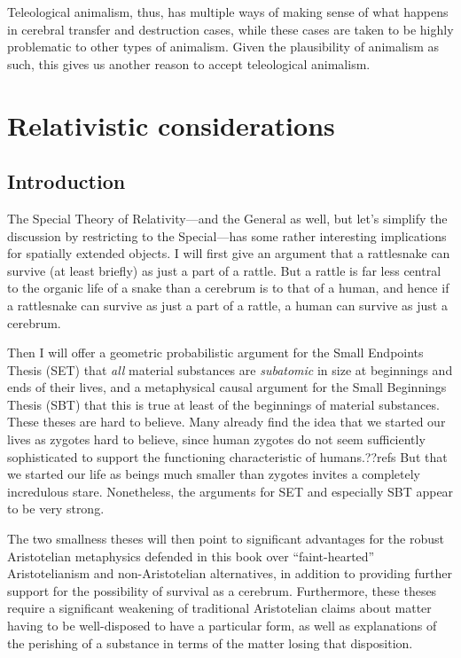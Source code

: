 Teleological animalism, thus, has multiple ways of making sense of what happens in cerebral transfer and destruction cases, while these cases
are taken to be highly problematic to other types of animalism. Given the plausibility of animalism as such, this gives us another reason to accept
teleological animalism.

\section{Relativistic considerations}
\subsection{Introduction}
The Special Theory of Relativity---and the General as well, but let's simplify the discussion by restricting to 
the Special---has some rather interesting implications for spatially extended objects. I will first give an argument
that a rattlesnake can survive (at least briefly) as just a part of a rattle. But a rattle is far less central to the organic
life of a snake than a cerebrum is to that of a human, and hence if a rattlesnake can survive as just a part of a rattle, a human
can survive as just a cerebrum. 

Then I will offer a geometric probabilistic argument for the Small Endpoints Thesis 
(SET) that \textit{all} material substances are \textit{subatomic} in size at beginnings and ends of their lives, 
and a metaphysical causal argument for the Small Beginnings Thesis (SBT) that this is true at least of the 
beginnings of material substances. These theses are hard to believe. Many already find the idea that we started 
our lives as zygotes hard to believe, since human zygotes do not seem sufficiently sophisticated to support the 
functioning characteristic of humans.??refs But that we started our life as beings much smaller than zygotes invites 
a completely incredulous stare. Nonetheless, the arguments for SET and especially SBT appear to be very strong.

The two smallness theses will then point to significant advantages for the robust Aristotelian metaphysics defended 
in this book over ``faint-hearted'' Aristotelianism and non-Aristotelian alternatives, in addition to providing
further support for the possibility of survival as a cerebrum. Furthermore, these theses require a significant 
weakening of traditional Aristotelian claims about matter having to be well-disposed to have a particular form, 
as well as explanations of the perishing of a substance in terms of the matter losing that disposition. 

